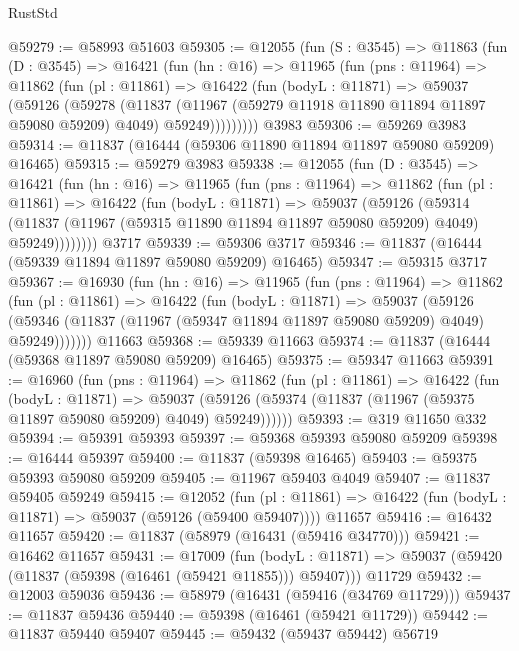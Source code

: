 \begin{lexlean}{RustStd}
\begin{coremodule}
{\begin{coremodule}
{{{{{{{{{{{{{{{{{{{{{{{{{{{{{{{{{{{{{{{{{{{{{{{{{{@59279 := @58993 @51603
@59305 := @12055
    (fun (S : @3545) =>
    @11863
      (fun (D : @3545) =>
      @16421
        (fun (hn : @16) =>
        @11965
          (fun (pns : @11964) =>
          @11862
            (fun (pl : @11861) =>
            @16422
              (fun (bodyL : @11871) =>
              @59037
                (@59126
                  (@59278
                    (@11837
                      (@11967 (@59279 @11918 @11890 @11894 @11897 @59080 @59209) @4049)
                      @59249)))))))))
    @3983
@59306 := @59269 @3983
@59314 := @11837 (@16444 (@59306 @11890 @11894 @11897 @59080 @59209) @16465)
@59315 := @59279 @3983
@59338 := @12055
    (fun (D : @3545) =>
    @16421
      (fun (hn : @16) =>
      @11965
        (fun (pns : @11964) =>
        @11862
          (fun (pl : @11861) =>
          @16422
            (fun (bodyL : @11871) =>
            @59037
              (@59126
                (@59314
                  (@11837 (@11967 (@59315 @11890 @11894 @11897 @59080 @59209) @4049) @59249))))))))
    @3717
@59339 := @59306 @3717
@59346 := @11837 (@16444 (@59339 @11894 @11897 @59080 @59209) @16465)
@59347 := @59315 @3717
@59367 := @16930
    (fun (hn : @16) =>
    @11965
      (fun (pns : @11964) =>
      @11862
        (fun (pl : @11861) =>
        @16422
          (fun (bodyL : @11871) =>
          @59037
            (@59126
              (@59346 (@11837 (@11967 (@59347 @11894 @11897 @59080 @59209) @4049) @59249)))))))
    @11663
@59368 := @59339 @11663
@59374 := @11837 (@16444 (@59368 @11897 @59080 @59209) @16465)
@59375 := @59347 @11663
@59391 := @16960
    (fun (pns : @11964) =>
    @11862
      (fun (pl : @11861) =>
      @16422
        (fun (bodyL : @11871) =>
        @59037 (@59126 (@59374 (@11837 (@11967 (@59375 @11897 @59080 @59209) @4049) @59249))))))
@59393 := @319 @11650 @332
@59394 := @59391 @59393
@59397 := @59368 @59393 @59080 @59209
@59398 := @16444 @59397
@59400 := @11837 (@59398 @16465)
@59403 := @59375 @59393 @59080 @59209
@59405 := @11967 @59403 @4049
@59407 := @11837 @59405 @59249
@59415 := @12052
    (fun (pl : @11861) => @16422 (fun (bodyL : @11871) => @59037 (@59126 (@59400 @59407))))
    @11657
@59416 := @16432 @11657
@59420 := @11837 (@58979 (@16431 (@59416 @34770)))
@59421 := @16462 @11657
@59431 := @17009
    (fun (bodyL : @11871) => @59037 (@59420 (@11837 (@59398 (@16461 (@59421 @11855))) @59407)))
    @11729
@59432 := @12003 @59036
@59436 := @58979 (@16431 (@59416 (@34769 @11729)))
@59437 := @11837 @59436
@59440 := @59398 (@16461 (@59421 @11729))
@59442 := @11837 @59440 @59407
@59445 := @59432 (@59437 @59442) @56719
}}}}}}}}}}}}}}}}}}}}}}}}}}}}}}}}}}}}}}}}}}}}}}}}}}
\end{coremodule}}
\end{coremodule}
\end{lexlean}

